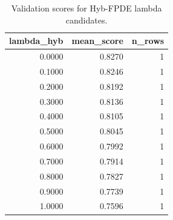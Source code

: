 \begin{table}[t]
\caption{Validation scores for Hyb-FPDE lambda candidates.}
\label{tab:lambda_distribution_computed}
\centering
\begin{tabular}{rrr}
\toprule
lambda\_hyb & mean\_score & n\_rows \\
\midrule
0.0000 & 0.8270 & 1 \\
0.1000 & 0.8246 & 1 \\
0.2000 & 0.8192 & 1 \\
0.3000 & 0.8136 & 1 \\
0.4000 & 0.8105 & 1 \\
0.5000 & 0.8045 & 1 \\
0.6000 & 0.7992 & 1 \\
0.7000 & 0.7914 & 1 \\
0.8000 & 0.7827 & 1 \\
0.9000 & 0.7739 & 1 \\
1.0000 & 0.7596 & 1 \\
\bottomrule
\end{tabular}

\end{table}
